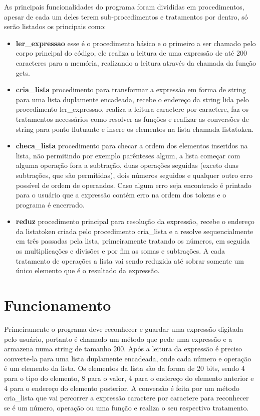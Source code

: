 \documentclass[12pt]{article}
\begin{document}
As principais funcionalidades do programa foram divididas em procedimentos, apesar de cada um deles terem sub-procedimentos e tratamentos por dentro, só serão listados os principais como:

\begin{itemize}

\item \textbf{ler\_expressao} esse é o procedimento básico e o primeiro a ser chamado pelo corpo principal do código, ele realiza a leitura de uma expressão de até 200 caracteres para a memória, realizando a leitura através da chamada da função gets.

\item \textbf{cria\_lista} procedimento para transformar a expressão em forma de string para uma lista duplamente encadeada, recebe o endereço da string lida pelo procedimento ler\_expressao, realiza a leitura caractere por caractere, faz os tratamentos necessários como resolver as funções e realizar as conversões de string para ponto flutuante e insere os elementos na lista chamada listatoken.

\item \textbf{checa\_lista} procedimento para checar a ordem dos elementos inseridos na lista, não permitindo por exemplo parênteses algum, a lista começar com alguma operação fora a subtração, duas operações seguidas (exceto duas subtrações, que são permitidas), dois números seguidos e qualquer outro erro possível de ordem de operandos. Caso algum erro seja encontrado é printado para o usuário que a expressão contém erro na ordem dos tokens e o programa é encerrado.

\item \textbf{reduz} procedimento principal para resolução da expressão, recebe o endereço da listatoken criada pelo procedimento cria\_lista e a resolve sequencialmente em três passadas pela lista, primeiramente tratando os números, em seguida as multiplicações e divisões e por fim as somas e subtrações. A cada tratamento de operações a lista vai sendo reduzida até sobrar somente um único elemento que é o resultado da expressão.

\end{itemize}

\section*{Funcionamento}

Primeiramente o programa deve reconhecer e guardar uma expressão digitada pelo usuário, portanto é chamado um método que pede uma expressão e a armazena numa string de tamanho 200. Após a leitura da expressão é preciso converte-la para uma lista duplamente encadeada, onde cada número e operação é um elemento da lista. Os elementos da lista são da forma de 20 bits, sendo 4 para o tipo do elemento, 8 para o valor, 4 para o endereço do elemento anterior e 4 para o endereço do elemento posterior. A conversão é feita por um método cria\_lista que vai percorrer a expressão caractere por caractere para reconhecer se é um número, operação ou uma função e realiza o seu respectivo tratamento.
\end{document}

